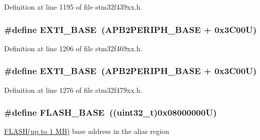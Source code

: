 Definition at line 1195 of file stm32f439xx.\+h.

\subsubsection[{\texorpdfstring{E\+X\+T\+I\+\_\+\+B\+A\+SE}{EXTI_BASE}}]{\setlength{\rightskip}{0pt plus 5cm}\#define E\+X\+T\+I\+\_\+\+B\+A\+SE~({\bf A\+P\+B2\+P\+E\+R\+I\+P\+H\+\_\+\+B\+A\+SE} + 0x3\+C00\+U)}\hypertarget{group___peripheral__memory__map_ga87371508b3bcdcd98cd1ec629be29061}{}\label{group___peripheral__memory__map_ga87371508b3bcdcd98cd1ec629be29061}


Definition at line 1206 of file stm32f469xx.\+h.

\subsubsection[{\texorpdfstring{E\+X\+T\+I\+\_\+\+B\+A\+SE}{EXTI_BASE}}]{\setlength{\rightskip}{0pt plus 5cm}\#define E\+X\+T\+I\+\_\+\+B\+A\+SE~({\bf A\+P\+B2\+P\+E\+R\+I\+P\+H\+\_\+\+B\+A\+SE} + 0x3\+C00\+U)}\hypertarget{group___peripheral__memory__map_ga87371508b3bcdcd98cd1ec629be29061}{}\label{group___peripheral__memory__map_ga87371508b3bcdcd98cd1ec629be29061}


Definition at line 1276 of file stm32f479xx.\+h.

\subsubsection[{\texorpdfstring{F\+L\+A\+S\+H\+\_\+\+B\+A\+SE}{FLASH_BASE}}]{\setlength{\rightskip}{0pt plus 5cm}\#define F\+L\+A\+S\+H\+\_\+\+B\+A\+SE~((uint32\+\_\+t)0x08000000\+U)}\hypertarget{group___peripheral__memory__map_ga23a9099a5f8fc9c6e253c0eecb2be8db}{}\label{group___peripheral__memory__map_ga23a9099a5f8fc9c6e253c0eecb2be8db}
\hyperlink{group___peripheral__declaration_ga844ea28ba1e0a5a0e497f16b61ea306b}{F\+L\+A\+S\+H(up to 1 M\+B)} base address in the alias region 

